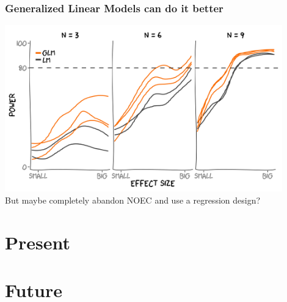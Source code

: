 \documentclass[12pt, t]{beamer}
\begin{document}
\begin{frame}
\frametitle{Generalized Linear Models can do it better}
\center
\includegraphics[width = 0.9\textwidth]{fig/glm1.png} \\
\pause
\center
But maybe completely abandon NOEC and use a regression design?
\end{frame}



\section{Present}
\subsection{}



\section{Future}
\subsection{}
\end{document}
